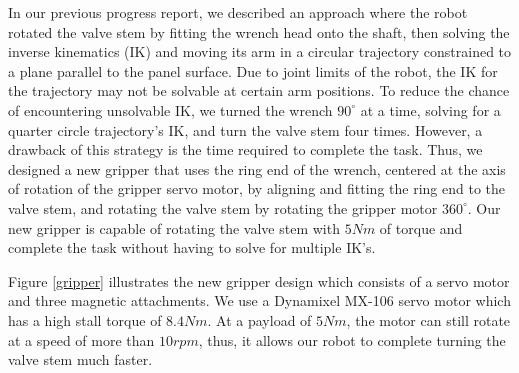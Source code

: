 \documentclass{standalone}
\begin{document}
In our previous progress report, we described an approach where the robot rotated the valve stem by fitting the wrench head onto the shaft, then solving the inverse kinematics (IK) and moving its arm in a circular trajectory constrained to a plane parallel to the panel surface.
Due to joint limits of the robot, the IK for the trajectory may
not be solvable at certain arm positions. To reduce the chance of encountering unsolvable IK, we turned the wrench $90^{\circ}$ at a time, solving for a quarter circle trajectory's IK, and turn the valve stem four times. However, a drawback of this strategy is the time required to
complete the task. Thus, we designed a new gripper that uses the ring
end of the wrench, centered at the axis of rotation of the gripper servo
motor, by aligning and fitting the ring end to the valve
stem, and rotating the valve stem by rotating the gripper motor
$360^{\circ}$. Our new gripper is capable of rotating the valve 
stem with $5Nm$ of torque and complete the task without having
to solve for multiple IK's.

Figure \ref{gripper} illustrates the new gripper design which consists of a
servo motor and three magnetic attachments. We use a Dynamixel MX-106
servo motor which has a high stall torque of $8.4Nm$. At a payload of 
$5Nm$, the motor can still rotate at a speed of
more than $10 rpm$, thus, it allows our robot to complete turning 
the valve stem much faster.


\end{document}
